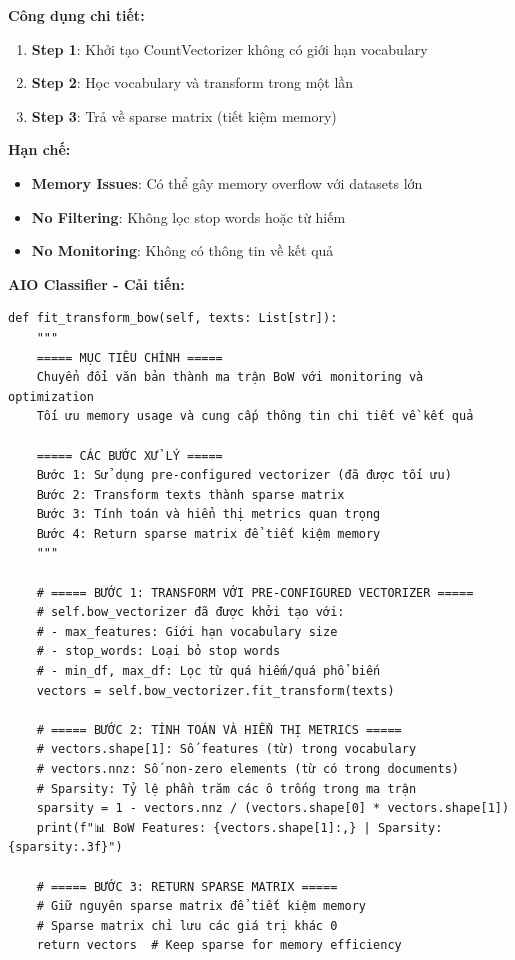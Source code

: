 \textbf{Công dụng chi tiết:}
\begin{enumerate}
    \item \textbf{Step 1}: Khởi tạo CountVectorizer không có giới hạn vocabulary
    \item \textbf{Step 2}: Học vocabulary và transform trong một lần
    \item \textbf{Step 3}: Trả về sparse matrix (tiết kiệm memory)
\end{enumerate}

\textbf{Hạn chế:}
\begin{itemize}
    \item \textbf{Memory Issues}: Có thể gây memory overflow với datasets lớn
    \item \textbf{No Filtering}: Không lọc stop words hoặc từ hiếm
    \item \textbf{No Monitoring}: Không có thông tin về kết quả
\end{itemize}

\textbf{AIO Classifier - Cải tiến:}
\begin{verbatim}
def fit_transform_bow(self, texts: List[str]):
    """
    ===== MỤC TIÊU CHÍNH =====
    Chuyển đổi văn bản thành ma trận BoW với monitoring và optimization
    Tối ưu memory usage và cung cấp thông tin chi tiết về kết quả
    
    ===== CÁC BƯỚC XỬ LÝ =====
    Bước 1: Sử dụng pre-configured vectorizer (đã được tối ưu)
    Bước 2: Transform texts thành sparse matrix
    Bước 3: Tính toán và hiển thị metrics quan trọng
    Bước 4: Return sparse matrix để tiết kiệm memory
    """
    
    # ===== BƯỚC 1: TRANSFORM VỚI PRE-CONFIGURED VECTORIZER =====
    # self.bow_vectorizer đã được khởi tạo với:
    # - max_features: Giới hạn vocabulary size
    # - stop_words: Loại bỏ stop words
    # - min_df, max_df: Lọc từ quá hiếm/quá phổ biến
    vectors = self.bow_vectorizer.fit_transform(texts)
    
    # ===== BƯỚC 2: TÍNH TOÁN VÀ HIỂN THỊ METRICS =====
    # vectors.shape[1]: Số features (từ) trong vocabulary
    # vectors.nnz: Số non-zero elements (từ có trong documents)
    # Sparsity: Tỷ lệ phần trăm các ô trống trong ma trận
    sparsity = 1 - vectors.nnz / (vectors.shape[0] * vectors.shape[1])
    print(f"📊 BoW Features: {vectors.shape[1]:,} | Sparsity: {sparsity:.3f}")
    
    # ===== BƯỚC 3: RETURN SPARSE MATRIX =====
    # Giữ nguyên sparse matrix để tiết kiệm memory
    # Sparse matrix chỉ lưu các giá trị khác 0
    return vectors  # Keep sparse for memory efficiency
\end{verbatim}


